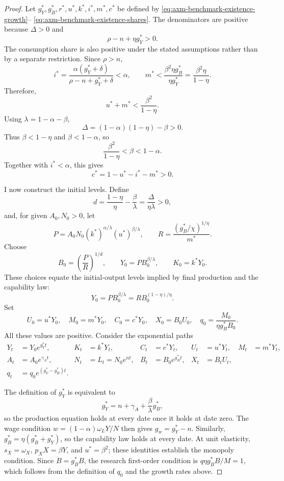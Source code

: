 \begin{proof}
Let \(g_Y^*,g_B^*,r^*,u^*,k^*,i^*,m^*,c^*\) be defined by
\eqref{eq:axm-benchmark-existence-growth}--
\eqref{eq:axm-benchmark-existence-shares}. The denominators are positive because
\(\Delta>0\) and
\[
 \rho-n+\eta g_Y^*>0.
\]
The consumption share is also positive under the stated assumptions rather
than by a separate restriction. Since \(\rho>n\),
\[
 i^*=\frac{\alpha(g_Y^*+\delta)}
 {\rho-n+g_Y^*+\delta}<\alpha,
 \qquad
 m^*<\frac{\beta^2\eta g_B^*}{\eta g_Y^*}
 =\frac{\beta^2\eta}{1-\eta}.
\]
Therefore,
\[
 u^*+m^*<\frac{\beta^2}{1-\eta}.
\]
Using \(\lambda=1-\alpha-\beta\),
\[
 \Delta=(1-\alpha)(1-\eta)-\beta>0.
\]
Thus \(\beta<1-\eta\) and \(\beta<1-\alpha\), so
\[
 \frac{\beta^2}{1-\eta}<\beta<1-\alpha.
\]
Together with \(i^*<\alpha\), this gives
\[
 c^*=1-u^*-i^*-m^*>0.
\]

I now construct the initial levels. Define
\[
 d=\frac{1-\eta}{\eta}-\frac{\beta}{\lambda}
   =\frac{\Delta}{\eta\lambda}>0,
\]
and, for given \(A_0,N_0>0\), let
\[
 P=A_0N_0(k^*)^{\alpha/\lambda}(u^*)^{\beta/\lambda},
 \qquad
 R=\frac{(g_B^*/\chi)^{1/\eta}}{m^*}.
\]
Choose
\begin{equation}
 B_0=\left(\frac{P}{R}\right)^{1/d},\qquad
 Y_0=P B_0^{\beta/\lambda},\qquad K_0=k^*Y_0.
 \label{eq:axm-benchmark-existence-levels}
\end{equation}
These choices equate the initial-output levels implied by final production and
the capability law:
\[
 Y_0=P B_0^{\beta/\lambda}
 =R B_0^{(1-\eta)/\eta}.
\]
Set
\[
 U_0=u^*Y_0,\quad M_0=m^*Y_0,\quad C_0=c^*Y_0,
 \quad X_0=B_0U_0,\quad
 q_0=\frac{M_0}{\eta g_B^*B_0}.
\]
All these values are positive. Consider the exponential paths
\begin{align*}
 Y_t&=Y_0e^{g_Y^*t},& K_t&=k^*Y_t,&
 C_t&=c^*Y_t,& U_t&=u^*Y_t,& M_t&=m^*Y_t,\\
 A_t&=A_0e^{\gamma_At},& N_t&=L_t=N_0e^{nt},&
 B_t&=B_0e^{g_B^*t},& X_t&=B_tU_t,\\
 q_t&=q_0e^{(g_Y^*-g_B^*)t}.&&&&&&
\end{align*}

The definition of \(g_Y^*\) is equivalent to
\[
 g_Y^*=n+\gamma_A+\frac{\beta}{\lambda}g_B^*,
\]
so the production equation holds at every date once it holds at date zero.
The wage condition \(w=(1-\alpha)\omega_LY/N\) then gives
\(g_w=g_Y^*-n\). Similarly, \(g_B^*=\eta(g_B^*+g_Y^*)\), so the
capability law holds at every date. At unit elasticity, \(s_X=\omega_X\),
\(p_XX=\beta Y\), and \(u^*=\beta^2\); these identities establish the
monopoly condition. Since \(\dot B=g_B^*B\), the research first-order condition
is \(q\eta g_B^*B/M=1\), which follows from the definition of \(q_0\) and the
growth rates above.


\end{proof}
